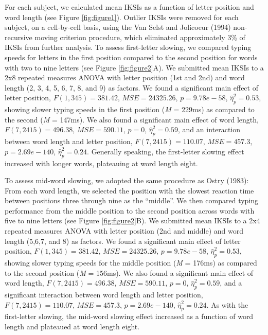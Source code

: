 \documentclass[,man,floatsintext]{apa6}
\begin{document}
For each subject, we calculated mean IKSIs as a function of letter position and word length (see Figure \ref{fig:figure1}). Outlier IKSIs were removed for each subject, on a cell-by-cell basis, using the Van Selst and Jolicoeur (1994) non-recursive moving criterion procedure, which eliminated approximately 3\% of IKSIs from further analysis. To assess first-letter slowing, we compared typing speeds for letters in the first position compared to the second position for words with two to nine letters (see Figure \ref{fig:figure2}A). We submitted mean IKSIs to a 2x8 repeated measures ANOVA with letter position (1st and 2nd) and word length (2, 3, 4, 5, 6, 7, 8, and 9) as factors. We found a significant main effect of letter position, \(F(1, 345) = 381.42\), \(\mathit{MSE} = 24325.26\), \(p = 9.78e-58\), \(\hat{\eta}^2_\textit{p} = 0.53\), showing slower typing speeds in the first position (\textit{M} = 229ms) as compared to the second (\textit{M} = 147ms). We also found a significant main effect of word length, \(F(7, 2415) = 496.38\), \(\mathit{MSE} = 590.11\), \(p = 0\), \(\hat{\eta}^2_\textit{p} = 0.59\), and an interaction between word length and letter position, \(F(7, 2415) = 110.07\), \(\mathit{MSE} = 457.3\), \(p = 2.69e-140\), \(\hat{\eta}^2_\textit{p} = 0.24\). Generally speaking, the first-letter slowing effect increased with longer words, plateauing at word length eight.

To assess mid-word slowing, we adopted the same procedure as Ostry (1983): From each word length, we selected the position with the slowest reaction time between positions three through nine as the \enquote{middle}. We then compared typing performance from the middle position to the second position across words with five to nine letters (see Figure \ref{fig:figure2}B). We submitted mean IKSIs to a 2x4 repeated measures ANOVA with letter position (2nd and middle) and word length (5,6,7, and 8) as factors. We found a significant main effect of letter position, \(F(1, 345) = 381.42\), \(\mathit{MSE} = 24325.26\), \(p = 9.78e-58\), \(\hat{\eta}^2_\textit{p} = 0.53\), showing slower typing speeds for the middle position (\textit{M} = 176ms) as compared to the second position (\textit{M} = 156ms). We also found a significant main effect of word length, \(F(7, 2415) = 496.38\), \(\mathit{MSE} = 590.11\), \(p = 0\), \(\hat{\eta}^2_\textit{p} = 0.59\), and a significant interaction between word length and letter position, \(F(7, 2415) = 110.07\), \(\mathit{MSE} = 457.3\), \(p = 2.69e-140\), \(\hat{\eta}^2_\textit{p} = 0.24\). As with the first-letter slowing, the mid-word slowing effect increased as a function of word length and plateaued at word length eight.
\end{document}
